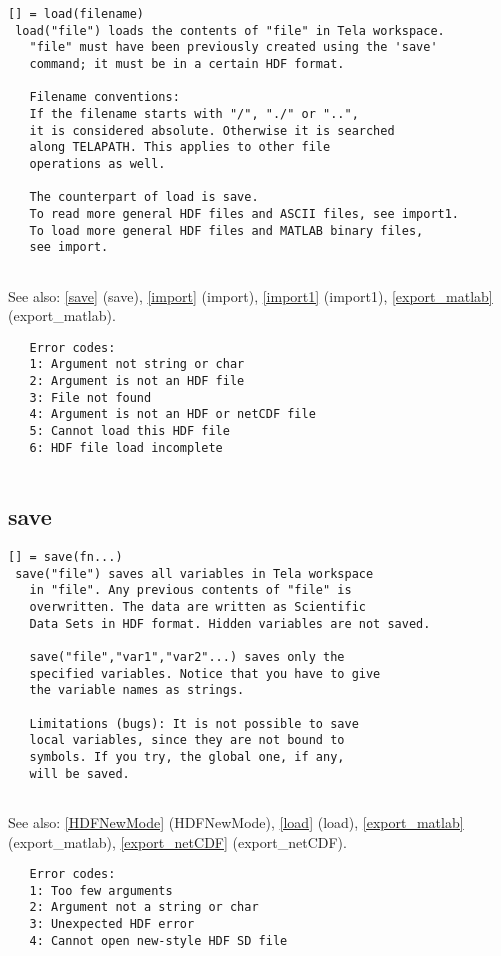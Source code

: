 \documentclass[a4paper]{article}
\begin{document}
\begin{tscreen}
\begin{verbatim}
[] = load(filename)
 load("file") loads the contents of "file" in Tela workspace.
   "file" must have been previously created using the 'save'
   command; it must be in a certain HDF format.
   
   Filename conventions:
   If the filename starts with "/", "./" or "..",
   it is considered absolute. Otherwise it is searched
   along TELAPATH. This applies to other file
   operations as well.
   
   The counterpart of load is save.
   To read more general HDF files and ASCII files, see import1.
   To load more general HDF files and MATLAB binary files,
   see import.
   
\end{verbatim}

See also: \ref{save} {(save)}, \ref{import} {(import)}, \ref{import1} {(import1)}, \ref{export_matlab} {(export\_matlab)}.
\begin{verbatim}
   Error codes:
   1: Argument not string or char
   2: Argument is not an HDF file
   3: File not found
   4: Argument is not an HDF or netCDF file
   5: Cannot load this HDF file
   6: HDF file load incomplete
   
\end{verbatim}
\end{tscreen}



\subsection{save\label{save}}

\begin{tscreen}
\begin{verbatim}
[] = save(fn...)
 save("file") saves all variables in Tela workspace
   in "file". Any previous contents of "file" is
   overwritten. The data are written as Scientific
   Data Sets in HDF format. Hidden variables are not saved.
   
   save("file","var1","var2"...) saves only the
   specified variables. Notice that you have to give
   the variable names as strings.
   
   Limitations (bugs): It is not possible to save
   local variables, since they are not bound to
   symbols. If you try, the global one, if any,
   will be saved.
   
\end{verbatim}

See also: \ref{HDFNewMode} {(HDFNewMode)}, \ref{load} {(load)}, \ref{export_matlab} {(export\_matlab)}, \ref{export_netCDF} {(export\_netCDF)}.
\begin{verbatim}
   Error codes:
   1: Too few arguments
   2: Argument not a string or char
   3: Unexpected HDF error
   4: Cannot open new-style HDF SD file
\end{verbatim}
\end{tscreen}
\end{document}

